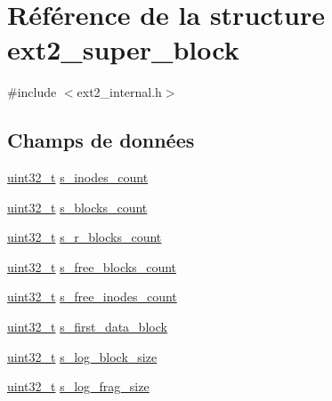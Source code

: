 \hypertarget{structext2__super__block}{\section{Référence de la structure ext2\+\_\+super\+\_\+block}
\label{structext2__super__block}
}


{\ttfamily \#include $<$ext2\+\_\+internal.\+h$>$}

\subsection*{Champs de données}
\begin{DoxyCompactItemize}
\item 
\hyperlink{kernel_2include_2types_8h_a33594304e786b158f3fb30289278f5af}{uint32\+\_\+t} \hyperlink{structext2__super__block_a2ea20f821c0ddc19b0adc7d1b8d0685d}{s\+\_\+inodes\+\_\+count}
\item 
\hyperlink{kernel_2include_2types_8h_a33594304e786b158f3fb30289278f5af}{uint32\+\_\+t} \hyperlink{structext2__super__block_a3878ffaff13c625cce6b825ecb797547}{s\+\_\+blocks\+\_\+count}
\item 
\hyperlink{kernel_2include_2types_8h_a33594304e786b158f3fb30289278f5af}{uint32\+\_\+t} \hyperlink{structext2__super__block_a660db33fc94622167793c6b080c515e4}{s\+\_\+r\+\_\+blocks\+\_\+count}
\item 
\hyperlink{kernel_2include_2types_8h_a33594304e786b158f3fb30289278f5af}{uint32\+\_\+t} \hyperlink{structext2__super__block_a005160872a0474cdc9be97da00b81b84}{s\+\_\+free\+\_\+blocks\+\_\+count}
\item 
\hyperlink{kernel_2include_2types_8h_a33594304e786b158f3fb30289278f5af}{uint32\+\_\+t} \hyperlink{structext2__super__block_aeefbe6028c7e1554805b033287de0097}{s\+\_\+free\+\_\+inodes\+\_\+count}
\item 
\hyperlink{kernel_2include_2types_8h_a33594304e786b158f3fb30289278f5af}{uint32\+\_\+t} \hyperlink{structext2__super__block_ab7c5dfba6eafbb1974f7628d4ae32601}{s\+\_\+first\+\_\+data\+\_\+block}
\item 
\hyperlink{kernel_2include_2types_8h_a33594304e786b158f3fb30289278f5af}{uint32\+\_\+t} \hyperlink{structext2__super__block_a34965ad64787db6bf0893e000b19f608}{s\+\_\+log\+\_\+block\+\_\+size}
\item 
\hyperlink{kernel_2include_2types_8h_a33594304e786b158f3fb30289278f5af}{uint32\+\_\+t} \hyperlink{structext2__super__block_a441780f5356cad879e465bb23d5c0659}{s\+\_\+log\+\_\+frag\+\_\+size}

\end{DoxyCompactItemize}
